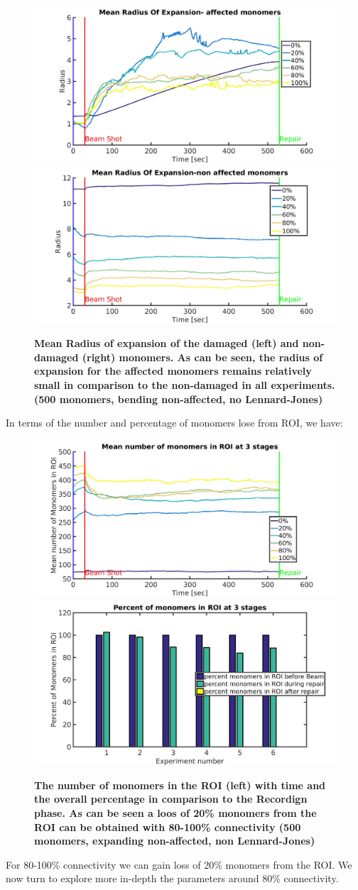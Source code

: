 \documentclass[12pt]{report}
\begin{document}
     
	\begin{figure}[H]
	\includegraphics[width=0.5\linewidth, height=0.3\textheight]{Images/expandNonDamaged/BreakAffectedCrosslinks/04/MeanRadiusOfExpansionAffected}
    \includegraphics[width=0.5\linewidth, height=0.3\textheight]{Images/expandNonDamaged/BreakAffectedCrosslinks/04/MeanRadiusOfExpansionNonAffected}
	\caption{\tiny{\textbf{Mean Radius of expansion of the damaged (left) and non-damaged (right) monomers. As can be seen,  the radius of expansion for the affected monomers remains relatively small in comparison to the non-damaged in all experiments. (500 monomers, bending non-affected, no Lennard-Jones)}}}
	\label{fig:MeanRadiusOfExpansionAffected}
	\end{figure}
	     
	In terms of the number and percentage of monomers lose from ROI, we have:
	\begin{figure}[H]
	\includegraphics[width=0.5\linewidth, height=0.3\textheight]{Images/expandNonDamaged/BreakAffectedCrosslinks/04/MeanNumMonomersInROI}
	\includegraphics[width=0.5\linewidth, height=0.3\textheight]{Images/expandNonDamaged/BreakAffectedCrosslinks/04/percentOfMonomersInROI}
	\caption{\tiny{\textbf{The number of monomers in the ROI (left) with time and the overall percentage in comparison to the Recordign phase. As can be seen a loos of 20\% monomers from the ROI can be obtained with 80-100\% connectivity  (500 monomers, expanding non-affected, non Lennard-Jones)}}}
	\label{fig:MeanNumMonomersInROI}
	\end{figure}
	     For 80-100\% connectivity we can gain loss of 20\% monomers from the ROI. We now turn to explore more in-depth the parameters around 80\% connectivity. 
	     										
\end{document}
